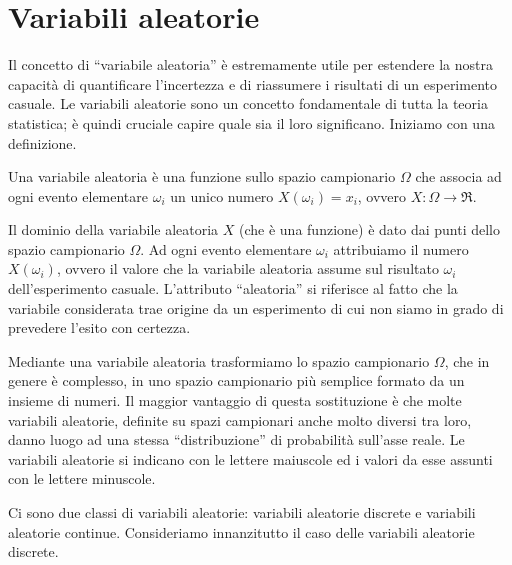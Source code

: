 \section{Variabili aleatorie}

Il concetto di \enquote{variabile aleatoria} è estremamente utile per estendere la nostra capacità di quantificare l'incertezza e di riassumere i risultati di un esperimento casuale.
Le variabili aleatorie sono un concetto fondamentale di tutta la teoria statistica; è quindi cruciale capire quale sia il loro significano.
Iniziamo con una definizione.
\begin{defn}
Una variabile aleatoria è una funzione sullo spazio campionario $\Omega$ che associa ad ogni evento elementare $\omega_i$ un unico numero $X(\omega_i) = x_i$, ovvero $X: \Omega \rightarrow \Re$.
\end{defn}
Il dominio della variabile aleatoria $X$ (che è una funzione) è dato dai punti dello spazio campionario $\Omega$.
Ad ogni evento elementare $\omega_i$ attribuiamo il numero $X(\omega_i)$, ovvero il valore che la variabile aleatoria assume sul risultato $\omega_i$ dell'esperimento casuale.
L'attributo \enquote{aleatoria} si riferisce al fatto che la variabile considerata trae origine da un esperimento di cui non siamo in grado di prevedere l'esito con certezza. 

Mediante una variabile aleatoria trasformiamo lo spazio campionario $\Omega$, che in genere è complesso, in uno spazio campionario più semplice formato da un insieme di numeri. 
Il maggior vantaggio di questa sostituzione è che molte variabili aleatorie, definite su spazi campionari anche molto diversi tra loro, danno luogo ad una stessa \enquote{distribuzione} di probabilità sull'asse reale. 
Le variabili aleatorie si indicano con le lettere maiuscole ed i valori da esse assunti con le lettere minuscole.  


Ci sono due classi di variabili aleatorie: variabili aleatorie discrete e variabili aleatorie continue.
Consideriamo innanzitutto il caso delle variabili aleatorie discrete.

